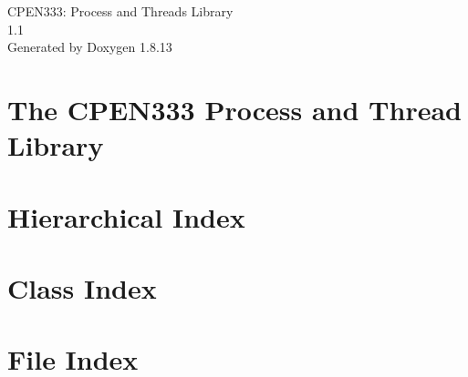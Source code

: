 \documentclass[twoside]{book}
\newcommand{\+}{\discretionary{\mbox{\scriptsize$\hookleftarrow$}}{}{}}
\newcommand{\clearemptydoublepage}{%
  \newpage{\pagestyle{empty}\cleardoublepage}%
}
\begin{document}
\hypersetup{pageanchor=false,
             bookmarksnumbered=true,
             pdfencoding=unicode
            }
\begin{titlepage}
\vspace*{7cm}
\begin{center}%
{\Large C\+P\+E\+N333\+: Process and Threads Library \\[1ex]\large 1.\+1 }\\
\vspace*{1cm}
{\large Generated by Doxygen 1.8.13}\\
\end{center}
\end{titlepage}
\clearemptydoublepage
{}
\tableofcontents
\clearemptydoublepage
{}
\hypersetup{pageanchor=true}

\chapter{The C\+P\+E\+N333 Process and Thread Library}
\label{index}\hypertarget{index}{}
\chapter{Hierarchical Index}

\chapter{Class Index}

\chapter{File Index}

\end{document}
